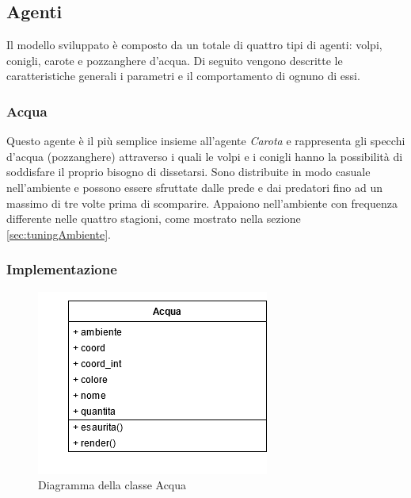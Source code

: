 \documentclass[11pt]{article}
\begin{document}
\subsection{Agenti}
Il modello sviluppato è composto da un totale di quattro tipi di agenti: volpi, conigli, carote e pozzanghere d'acqua. Di seguito vengono descritte le caratteristiche generali i parametri e il comportamento di ognuno di essi. 

\subsubsection{Acqua}
Questo agente è il più semplice insieme all'agente \emph{Carota} e rappresenta gli specchi d'acqua (pozzanghere) attraverso i quali le volpi e i conigli hanno la possibilità di soddisfare il proprio bisogno di dissetarsi. Sono distribuite in modo casuale nell'ambiente e possono essere sfruttate dalle prede e dai predatori fino ad un massimo di tre volte prima di scomparire. Appaiono nell'ambiente con frequenza differente nelle quattro stagioni, come mostrato nella sezione \ref{sec:tuningAmbiente}.  

\subsubsection{Implementazione}
\begin{figure}[h!]
     \centering
     \includegraphics[scale = 0.7]{Acqua.png}
     \caption{Diagramma della classe Acqua}
     \label{fig:acquaUML}
\end{figure}
\end{document}
